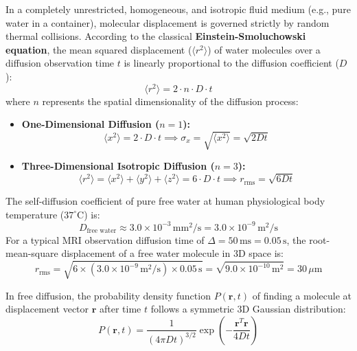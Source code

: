 \documentclass[11pt,a4paper]{article}
\begin{document}
In a completely unrestricted, homogeneous, and isotropic fluid medium (e.g., pure water in a container), molecular displacement is governed strictly by random thermal collisions. According to the classical \textbf{Einstein-Smoluchowski equation}, the mean squared displacement ($\langle r^2 \rangle$) of water molecules over a diffusion observation time $t$ is linearly proportional to the diffusion coefficient ($D$):
\begin{equation}
    \langle r^2 \rangle = 2 \cdot n \cdot D \cdot t
\end{equation}
where $n$ represents the spatial dimensionality of the diffusion process:
\begin{itemize}[leftmargin=*]
    \item \textbf{One-Dimensional Diffusion ($n = 1$):}
    \begin{equation}
        \langle x^2 \rangle = 2 \cdot D \cdot t \implies \sigma_x = \sqrt{\langle x^2 \rangle} = \sqrt{2 D t}
    \end{equation}
    \item \textbf{Three-Dimensional Isotropic Diffusion ($n = 3$):}
    \begin{equation}
        \langle r^2 \rangle = \langle x^2 \rangle + \langle y^2 \rangle + \langle z^2 \rangle = 6 \cdot D \cdot t \implies r_{\text{rms}} = \sqrt{6 D t}
    \end{equation}
\end{itemize}
The self-diffusion coefficient of pure free water at human physiological body temperature ($37^\circ\text{C}$) is:
\begin{equation}
    D_{\text{free water}} \approx 3.0 \times 10^{-3}\,\text{mm}^2/\text{s} = 3.0 \times 10^{-9}\,\text{m}^2/\text{s}
\end{equation}
For a typical MRI observation diffusion time of $\Delta = 50\,\text{ms} = 0.05\,\text{s}$, the root-mean-square displacement of a free water molecule in 3D space is:
\begin{equation}
    r_{\text{rms}} = \sqrt{6 \times (3.0 \times 10^{-9}\,\text{m}^2/\text{s}) \times 0.05\,\text{s}} = \sqrt{9.0 \times 10^{-10}\,\text{m}^2} = 30\,\mu\text{m}
\end{equation}

In free diffusion, the probability density function $P(\mathbf{r}, t)$ of finding a molecule at displacement vector $\mathbf{r}$ after time $t$ follows a symmetric 3D Gaussian distribution:
\begin{equation}
    P(\mathbf{r}, t) = \frac{1}{(4 \pi D t)^{3/2}} \exp\left( -\frac{\mathbf{r}^T \mathbf{r}}{4 D t} \right)
\end{equation}
\end{document}
